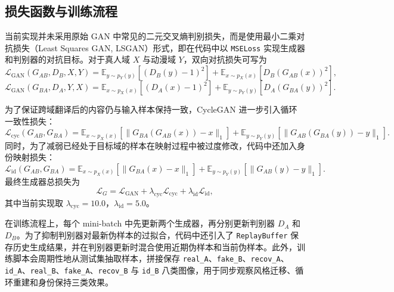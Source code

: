 \documentclass[12pt, a4paper, UTF8]{ctexart}
\begin{document}
\subsection{损失函数与训练流程}

当前实现并未采用原始 GAN 中常见的二元交叉熵判别损失，而是使用最小二乘对抗损失（Least Squares GAN, LSGAN）形式，即在代码中以 \verb|MSELoss| 实现生成器和判别器的对抗目标。对于真人域 $X$ 与动漫域 $Y$，双向对抗损失可写为
\begin{equation}
\mathcal{L}_{\mathrm{GAN}}(G_{AB}, D_B, X, Y)
= \mathbb{E}_{y \sim p_Y(y)} \left[(D_B(y)-1)^2\right]
+ \mathbb{E}_{x \sim p_X(x)} \left[D_B(G_{AB}(x))^2\right],
\end{equation}
\begin{equation}
\mathcal{L}_{\mathrm{GAN}}(G_{BA}, D_A, Y, X)
= \mathbb{E}_{x \sim p_X(x)} \left[(D_A(x)-1)^2\right]
+ \mathbb{E}_{y \sim p_Y(y)} \left[D_A(G_{BA}(y))^2\right].
\end{equation}

为了保证跨域翻译后的内容仍与输入样本保持一致，CycleGAN 进一步引入循环一致性损失：
\begin{equation}
\mathcal{L}_{\mathrm{cyc}}(G_{AB}, G_{BA})
= \mathbb{E}_{x \sim p_X(x)} \left[\|G_{BA}(G_{AB}(x)) - x\|_1\right]
+ \mathbb{E}_{y \sim p_Y(y)} \left[\|G_{AB}(G_{BA}(y)) - y\|_1\right].
\end{equation}
同时，为了减弱已经处于目标域的样本在映射过程中被过度修改，代码中还加入身份映射损失：
\begin{equation}
\mathcal{L}_{\mathrm{id}}(G_{AB}, G_{BA})
= \mathbb{E}_{x \sim p_X(x)} \left[\|G_{BA}(x) - x\|_1\right]
+ \mathbb{E}_{y \sim p_Y(y)} \left[\|G_{AB}(y) - y\|_1\right].
\end{equation}
最终生成器总损失为
\begin{equation}
\mathcal{L}_G
= \mathcal{L}_{\mathrm{GAN}}
+ \lambda_{\mathrm{cyc}} \mathcal{L}_{\mathrm{cyc}}
+ \lambda_{\mathrm{id}} \mathcal{L}_{\mathrm{id}},
\end{equation}
其中当前实现取 $\lambda_{\mathrm{cyc}}=10.0$，$\lambda_{\mathrm{id}}=5.0$。

在训练流程上，每个 mini-batch 中先更新两个生成器，再分别更新判别器 $D_A$ 和 $D_B$。为了抑制判别器对最新伪样本的过拟合，代码中还引入了 \verb|ReplayBuffer| 保存历史生成结果，并在判别器更新时混合使用近期伪样本和当前伪样本。此外，训练脚本会周期性地从测试集抽取样本，拼接保存 \verb|real_A|、\verb|fake_B|、\verb|recov_A|、\verb|id_A|、\verb|real_B|、\verb|fake_A|、\verb|recov_B| 与 \verb|id_B| 八类图像，用于同步观察风格迁移、循环重建和身份保持三类效果。
\end{document}
